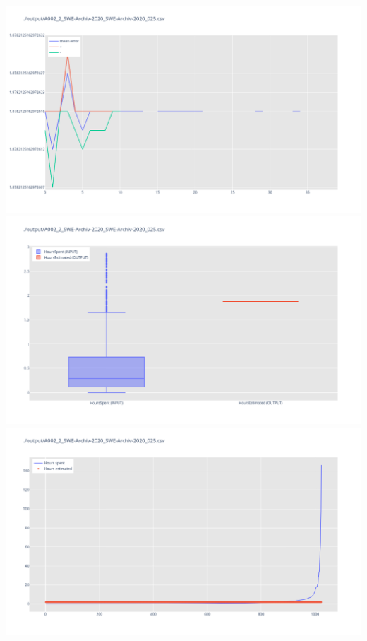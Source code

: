\includegraphics[width=\textwidth]{Scripts/output/A002_2_SWE-Archiv-2020_SWE-Archiv-2020_025.csv.error_distribution.png}
\includegraphics[width=\textwidth]{Scripts/output/A002_2_SWE-Archiv-2020_SWE-Archiv-2020_025.csv.png}
\includegraphics[width=\textwidth]{Scripts/output/A002_2_SWE-Archiv-2020_SWE-Archiv-2020_025.csv.scatter.png}
